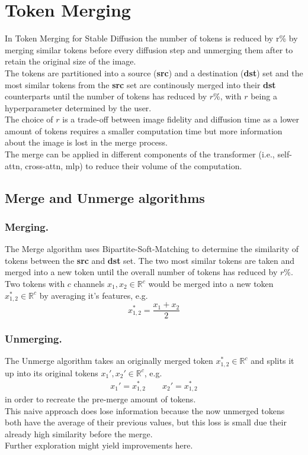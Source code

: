 \section{Token Merging}
In Token Merging for Stable Diffusion \cite{bolya2023tomesd} the number of tokens is reduced by r\% by merging similar tokens before every diffusion step and unmerging them after to retain the original size of the image.\\
The tokens are partitioned into a source (\textbf{src}) and a destination (\textbf{dst}) set and the most similar tokens from the \textbf{src} set are continously merged into their \textbf{dst} counterparts until the number of tokens has reduced by \(r\)\%, with \(r\) being a hyperparameter determined by the user.\\ 
The choice of \(r\) is a trade-off between image fidelity and diffusion time as a lower amount of tokens requires a smaller computation time but more information about the image is lost in the merge process.\\
The merge can be applied in different components of the transformer (i.e., self-attn, cross-attn, mlp) to reduce their volume of the computation. 

\subsection{Merge and Unmerge algorithms}
\subsubsection*{Merging.} The Merge algorithm uses Bipartite-Soft-Matching to determine the similarity of tokens between the \textbf{src} and \textbf{dst} set. The two most similar tokens are taken and merged into a new token until the overall number of tokens has reduced by \(r\%\).\\
Two tokens with \(c\) channels \(x_1, x_2 \in \mathbb{R}^c\) would be merged into a new token \(x_{1,2}^* \in \mathbb{R}^c \) by averaging it's features, e.g. \[x_{1,2}^* = \frac{x_1 + x_2}{2}\]

\subsubsection*{Unmerging.} The Unmerge algorithm takes an originally merged token $x_{1,2}^* \in \mathbb{R}^c$ and splits it up into its original tokens $x_1', x_2' \in \mathbb{R}^c$, e.g. 
\begin{align*}
    x_1' = x_{1,2}^* \quad\quad
    x_2' = x_{1,2}^*
\end{align*}
in order to recreate the pre-merge amount of tokens.\\
This naive approach does lose information because the now unmerged tokens both have the average of their previous values, but this loss is small due their already high similarity before the merge.\\ Further exploration might yield improvements here.


